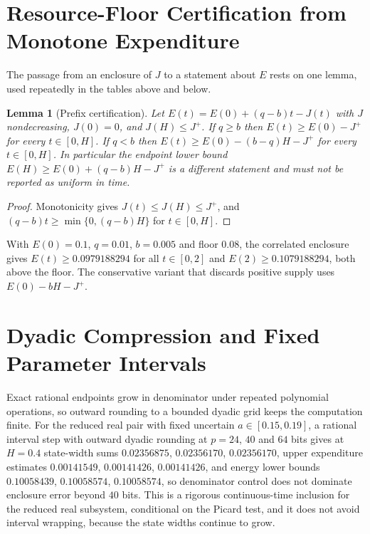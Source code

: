 \documentclass[11pt,notitlepage]{report}
\newtheorem{lemma}[theorem]{Lemma}
\theoremstyle{definition}
\theoremstyle{remark}
\begin{document}
\section{Resource-Floor Certification from Monotone Expenditure}
The passage from an enclosure of $J$ to a statement about $E$ rests on one lemma, used repeatedly in the tables above and below.
\begin{lemma}[Prefix certification]\label{lem:prefix}
Let $E(t)=E(0)+(q-b)t-J(t)$ with $J$ nondecreasing, $J(0)=0$, and $J(H)\le J^+$. If $q\ge b$ then $E(t)\ge E(0)-J^+$ for every $t\in[0,H]$. If $q<b$ then $E(t)\ge E(0)-(b-q)H-J^+$ for every $t\in[0,H]$. In particular the endpoint lower bound $E(H)\ge E(0)+(q-b)H-J^+$ is a different statement and must not be reported as uniform in time.
\end{lemma}
\begin{proof}
Monotonicity gives $J(t)\le J(H)\le J^+$, and $(q-b)t\ge\min\{0,(q-b)H\}$ for $t\in[0,H]$.
\end{proof}
With $E(0)=0.1$, $q=0.01$, $b=0.005$ and floor $0.08$, the correlated enclosure gives $E(t)\ge0.0979188294$ for all $t\in[0,2]$ and $E(2)\ge0.1079188294$, both above the floor. The conservative variant that discards positive supply uses $E(0)-bH-J^+$.

\section{Dyadic Compression and Fixed Parameter Intervals}
Exact rational endpoints grow in denominator under repeated polynomial operations, so outward rounding to a bounded dyadic grid keeps the computation finite. For the reduced real pair with fixed uncertain $a\in[0.15,0.19]$, a rational interval step with outward dyadic rounding at $p=24$, $40$ and $64$ bits gives at $H=0.4$ state-width sums $0.02356875$, $0.02356170$, $0.02356170$, upper expenditure estimates $0.00141549$, $0.00141426$, $0.00141426$, and energy lower bounds $0.10058439$, $0.10058574$, $0.10058574$, so denominator control does not dominate enclosure error beyond $40$ bits. This is a rigorous continuous-time inclusion for the reduced real subsystem, conditional on the Picard test, and it does not avoid interval wrapping, because the state widths continue to grow.
\end{document}

